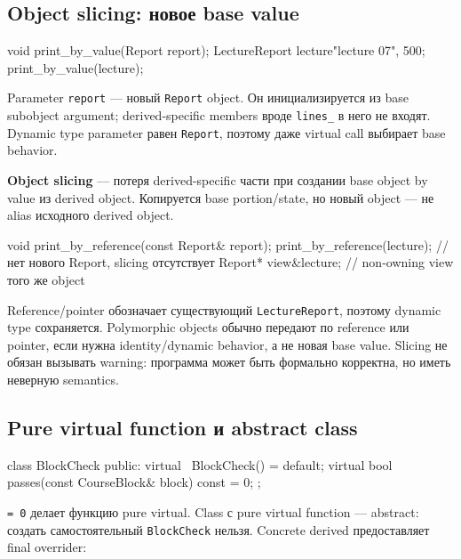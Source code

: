\subsection{Object slicing: новое base value}

\begin{cppcode}
void print_by_value(Report report);
LectureReport lecture{"lecture 07", 500};
print_by_value(lecture);
\end{cppcode}

Parameter \texttt{report} --- новый \texttt{Report} object. Он
инициализируется из base subobject argument; derived-specific members вроде
\texttt{lines\_} в него не входят. Dynamic type parameter равен
\texttt{Report}, поэтому даже virtual call выбирает base behavior.

\begin{definition}
\textbf{Object slicing} --- потеря derived-specific части при создании base
object by value из derived object. Копируется base portion/state, но новый
object --- не alias исходного derived object.
\end{definition}

\begin{cppcode}
void print_by_reference(const Report& report);
print_by_reference(lecture); // нет нового Report, slicing отсутствует
Report* view{&lecture};       // non-owning view того же object
\end{cppcode}

Reference/pointer обозначает существующий \texttt{LectureReport}, поэтому
dynamic type сохраняется. Polymorphic objects обычно передают по reference или
pointer, если нужна identity/dynamic behavior, а не новая base value. Slicing
не обязан вызывать warning: программа может быть формально корректна, но иметь
неверную semantics.

\subsection{Pure virtual function и abstract class}

\begin{cppcode}
class BlockCheck {
public:
    virtual ~BlockCheck() = default;
    virtual bool passes(const CourseBlock& block) const = 0;
};
\end{cppcode}

\texttt{= 0} делает функцию pure virtual. Class с pure virtual function
--- abstract: создать самостоятельный \texttt{BlockCheck} нельзя.
Concrete derived предоставляет final overrider:

